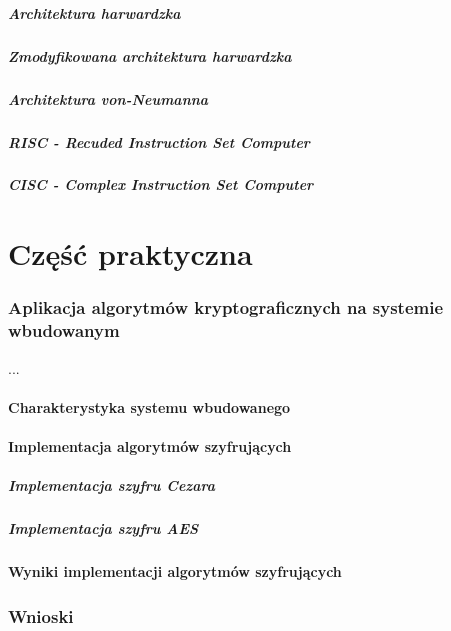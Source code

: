 \documentclass[12p]{article}
\begin{document}
\subsubsection{Architektura harwardzka}
\subsubsection{Zmodyfikowana architektura harwardzka}
\subsubsection{Architektura von-Neumanna}
\subsubsection{RISC - Recuded Instruction Set Computer}
\subsubsection{CISC - Complex Instruction Set Computer}

\newpage
\part{Część praktyczna}
\section{Aplikacja algorytmów kryptograficznych na systemie wbudowanym}
  ...
\subsection{Charakterystyka systemu wbudowanego}
\subsection{Implementacja algorytmów szyfrujących}
\subsubsection{Implementacja szyfru Cezara}
\subsubsection{Implementacja szyfru AES}
\subsection{Wyniki implementacji algorytmów szyfrujących} 
\newpage
\section{Wnioski}
\end{document}
